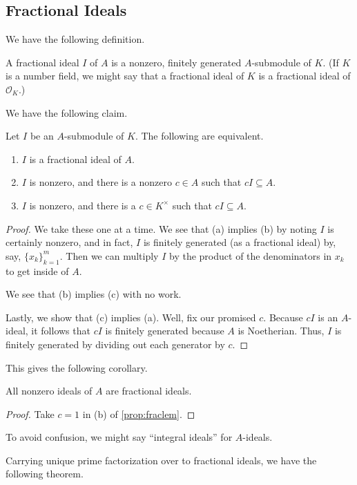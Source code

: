 \documentclass[../notes.tex]{subfiles}
\begin{document}
\subsection{Fractional Ideals}
We have the following definition.
\begin{defi}
    A fractional ideal $I$ of $A$ is a nonzero, finitely generated $A$-submodule of $K.$ (If $K$ is a number field, we might say that a fractional ideal of $K$ is a fractional ideal of $\mathcal O_K.$)
\end{defi}
We have the following claim.
\begin{prop} \label{prop:fraclem}
    Let $I$ be an $A$-submodule of $K.$ The following are equivalent.
    \begin{enumerate}[label=(\alph*)]
        \item $I$ is a fractional ideal of $A.$
        \item $I$ is nonzero, and there is a nonzero $c\in A$ such that $cI\subseteq A.$
        \item $I$ is nonzero, and there is a $c\in K^\times$ such that $cI\subseteq A.$
    \end{enumerate}
\end{prop}
\begin{proof}
    We take these one at a time. We see that (a) implies (b) by noting $I$ is certainly nonzero, and in fact, $I$ is finitely generated (as a fractional ideal) by, say, $\{x_k\}_{k=1}^m.$ Then we can multiply $I$ by the product of the denominators in $x_k$ to get inside of $A.$

    We see that (b) implies (c) with no work.

    Lastly, we show that (c) implies (a). Well, fix our promised $c.$ Because $cI$ is an $A$-ideal, it follows that $cI$ is finitely generated because $A$ is Noetherian. Thus, $I$ is finitely generated by dividing out each generator by $c.$
\end{proof}
This gives the following corollary.
\begin{cor}
    All nonzero ideals of $A$ are fractional ideals.
\end{cor}
\begin{proof}
    Take $c=1$ in (b) of \autoref{prop:fraclem}.
\end{proof}
\begin{remark}
    To avoid confusion, we might say ``integral ideals'' for $A$-ideals.
\end{remark}
Carrying unique prime factorization over to fractional ideals, we have the following theorem.
\end{document}
